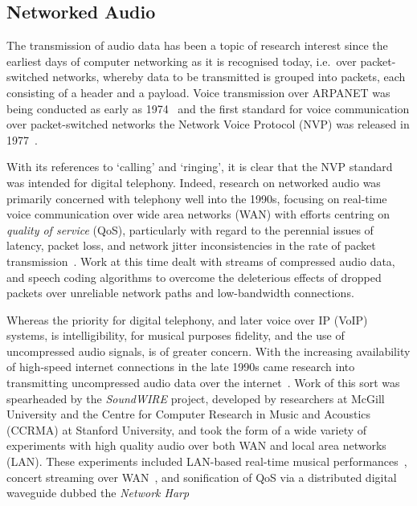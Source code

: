 \subsection{Networked Audio}\label{subsec:networked-audio}

The transmission of audio data has been a topic of research interest since the
earliest days of computer networking as it is recognised today, i.e.\ over
packet-switched networks, whereby data to be transmitted is grouped into
packets, each consisting of a header and a payload.
Voice transmission over ARPANET was being conducted as early as
1974~\citep{schulzrinne_voice_1992} and the first standard for voice
communication over packet-switched networks \textemdash{} the Network Voice
Protocol (NVP) \textemdash{} was released in
1977~\citep{cohen_specifications_1977}.

With its references to `calling' and `ringing', it is clear that the NVP
standard was intended for digital telephony.
Indeed, research on networked audio was primarily concerned with telephony well
into the 1990s, focusing on real-time voice communication over wide area
networks (WAN) with efforts centring on \textit{quality of service} (QoS),
particularly with regard to the perennial issues of latency, packet loss, and
network jitter \textemdash{} inconsistencies in the rate of packet
transmission~\citep{hardman_reliable_1995,hardman_successful_1998}.
Work at this time dealt with streams of compressed audio data, and speech
coding algorithms to overcome the deleterious effects of dropped packets over
unreliable network paths and low-bandwidth connections.

Whereas the priority for digital telephony, and later voice over IP (VoIP)
systems, is intelligibility, for musical purposes fidelity, and the use of
uncompressed audio signals, is of greater concern.
With the increasing availability of high-speed internet connections in the late
1990s came research into transmitting uncompressed audio data over the
internet~\citep{chafe_simplified_2000,xu_real-time_2000}.
Work of this sort was spearheaded by the \textit{SoundWIRE} project, developed
by researchers at McGill University and the Centre for Computer Research in
Music and Acoustics (CCRMA) at Stanford University, and took the form of
a wide variety of experiments with high quality audio over both WAN and local
area networks (LAN).
These experiments included LAN-based real-time musical
performances~\citep{chafe_simplified_2000}, concert streaming over
WAN~\citep{xu_real-time_2000,chafe_simplified_2000}, and sonification of QoS via
a distributed digital waveguide dubbed the
\textit{Network Harp}~\citep{chafe_simplified_2000,chafe_physical_2002}

